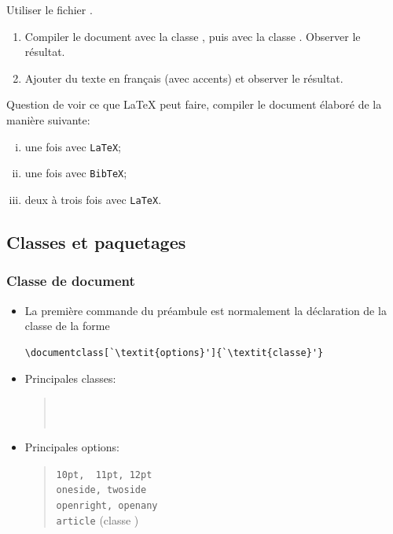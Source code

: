 \begin{frame}[plain,fragile=singleslide]
  \begin{exercice}
    Utiliser le fichier .
    \begin{enumerate}
    \item Compiler le document avec la classe , puis
      avec la classe . Observer le résultat.
    \item Ajouter du texte en français (avec accents) et observer le
      résultat.
    \end{enumerate}
  \end{exercice}

  \begin{exercice}
    Question de voir ce que {\LaTeX} peut faire, compiler le document
    élaboré  de la manière suivante:
    \begin{enumerate}[i)]
    \item une fois avec \texttt{LaTeX};
    \item une fois avec \texttt{BibTeX};
    \item deux à trois fois avec \texttt{LaTeX}.
    \end{enumerate}
  \end{exercice}
\end{frame}

\subsection{Classes et paquetages}

\begin{frame}[fragile]
  \frametitle{Classe de document}
  \begin{itemize}[<+->]
  \item La première commande du préambule est normalement la
    déclaration de la classe de la forme
\begin{lstlisting}
\documentclass[`\textit{options}']{`\textit{classe}'}
\end{lstlisting}
  \item Principales classes:
    \begin{quote}
       \\
      {\color{emphasis} } \\
      {\color{emphasis} }
    \end{quote}
  \item Principales options:
    \begin{quote}
      \texttt{10pt, {\color{emphasis} 11pt}, 12pt} \\
      \texttt{oneside, twoside} \\
      \texttt{openright, openany} \\
      {\color{emphasis} \texttt{article}} (classe )
    \end{quote}
  \end{itemize}
\end{frame}

